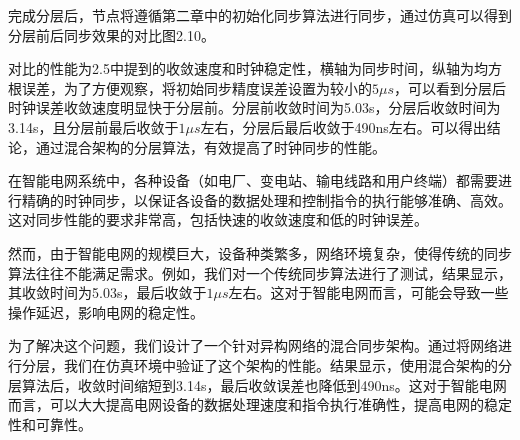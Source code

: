 \documentclass[UTF8,a4paper,12pt]{ctexart}
\numberwithin{equation}{section}
\begin{document}
完成分层后，节点将遵循第二章中的初始化同步算法进行同步，通过仿真可以得到分层前后同步效果的对比图2.10。
\begin{figure}[H] 
\end{figure}

对比的性能为2.5中提到的收敛速度和时钟稳定性，横轴为同步时间，纵轴为均方根误差，为了方便观察，将初始同步精度误差设置为较小的$5\mu s$，可以看到分层后时钟误差收敛速度明显快于分层前。分层前收敛时间为5.03s，分层后收敛时间为3.14s，且分层前最后收敛于$1\mu s$左右，分层后最后收敛于490ns左右。可以得出结论，通过混合架构的分层算法，有效提高了时钟同步的性能。

在智能电网系统中，各种设备（如电厂、变电站、输电线路和用户终端）都需要进行精确的时钟同步，以保证各设备的数据处理和控制指令的执行能够准确、高效。这对同步性能的要求非常高，包括快速的收敛速度和低的时钟误差。

然而，由于智能电网的规模巨大，设备种类繁多，网络环境复杂，使得传统的同步算法往往不能满足需求。例如，我们对一个传统同步算法进行了测试，结果显示，其收敛时间为5.03s，最后收敛于$1\mu s$左右。这对于智能电网而言，可能会导致一些操作延迟，影响电网的稳定性。

为了解决这个问题，我们设计了一个针对异构网络的混合同步架构。通过将网络进行分层，我们在仿真环境中验证了这个架构的性能。结果显示，使用混合架构的分层算法后，收敛时间缩短到3.14s，最后收敛误差也降低到490ns。这对于智能电网而言，可以大大提高电网设备的数据处理速度和指令执行准确性，提高电网的稳定性和可靠性。
\end{document}
